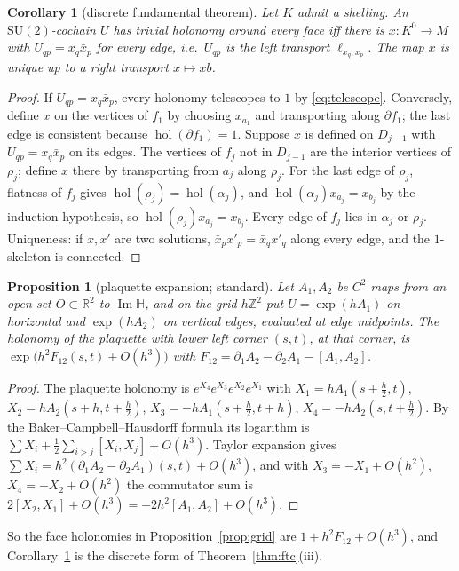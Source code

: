 \documentclass[11pt,reqno]{amsart}
\newtheorem{proposition}[theorem]{Proposition}
\newtheorem{corollary}[theorem]{Corollary}
\theoremstyle{definition}
\theoremstyle{remark}
\numberwithin{equation}{section}
\newcommand{\R}{\mathbb{R}}
\newcommand{\HH}{\mathbb{H}}
\newcommand{\Z}{\mathbb{Z}}
\newcommand{\im}{\operatorname{Im}}
\newcommand{\SU}{\mathrm{SU}}
\newcommand{\hol}{\operatorname{hol}}
\begin{document}
\begin{corollary}[discrete fundamental theorem]\label{cor:poincare}
Let $K$ admit a shelling.  An $\SU(2)$-cochain $U$ has trivial holonomy around every face iff there is
$x\colon K^0\to M$ with $U_{qp}=x_q\bar x_p$ for every edge, i.e.\ $U_{qp}$ is the left transport $\ell_{x_q,x_p}$.
The map $x$ is unique up to a right transport $x\mapsto xb$.
\end{corollary}
\begin{proof}
If $U_{qp}=x_q\bar x_p$, every holonomy telescopes to $1$ by \eqref{eq:telescope}.  Conversely, define $x$ on the
vertices of $f_1$ by choosing $x_{a_1}$ and transporting along $\partial f_1$; the last edge is consistent because
$\hol(\partial f_1)=1$.  Suppose $x$ is defined on $D_{j-1}$ with $U_{qp}=x_q\bar x_p$ on its edges.  The vertices of
$f_j$ not in $D_{j-1}$ are the interior vertices of $\rho_j$; define $x$ there by transporting from $a_j$ along
$\rho_j$.  For the last edge of $\rho_j$, flatness of $f_j$ gives $\hol(\rho_j)=\hol(\alpha_j)$, and
$\hol(\alpha_j)x_{a_j}=x_{b_j}$ by the induction hypothesis, so $\hol(\rho_j)x_{a_j}=x_{b_j}$.  Every edge of $f_j$ lies in
$\alpha_j$ or $\rho_j$.  Uniqueness: if $x,x'$ are two solutions, $\bar x_px'_p=\bar x_qx'_q$ along every edge, and the
$1$-skeleton is connected.
\end{proof}

\begin{proposition}[plaquette expansion; standard]\label{prop:plaquette}
Let $A_1,A_2$ be $C^2$ maps from an open set $O\subset\R^2$ to $\im\HH$, and on the grid $h\Z^2$ put $U=\exp(hA_1)$ on
horizontal and $\exp(hA_2)$ on vertical edges, evaluated at edge midpoints.  The holonomy of the plaquette with lower left corner $(s,t)$, at
that corner, is $\exp\bigl(h^2F_{12}(s,t)+O(h^3)\bigr)$ with $F_{12}=\partial_1A_2-\partial_2A_1-[A_1,A_2]$.
\end{proposition}
\begin{proof}
The plaquette holonomy is $e^{X_4}e^{X_3}e^{X_2}e^{X_1}$ with $X_1=hA_1(s+\frac h2,t)$,
$X_2=hA_2(s+h,t+\frac h2)$, $X_3=-hA_1(s+\frac h2,t+h)$, $X_4=-hA_2(s,t+\frac h2)$.  By the
Baker--Campbell--Hausdorff formula its logarithm is $\sum X_i+\tfrac12\sum_{i>j}[X_i,X_j]+O(h^3)$.  Taylor
expansion gives $\sum X_i=h^2(\partial_1A_2-\partial_2A_1)(s,t)+O(h^3)$, and with $X_3=-X_1+O(h^2)$,
$X_4=-X_2+O(h^2)$ the commutator sum is $2[X_2,X_1]+O(h^3)=-2h^2[A_1,A_2]+O(h^3)$.
\end{proof}

So the face holonomies in Proposition~\ref{prop:grid} are $1+h^2F_{12}+O(h^3)$, and
Corollary~\ref{cor:poincare} is the discrete form of Theorem~\ref{thm:ftc}(iii).
\end{document}
